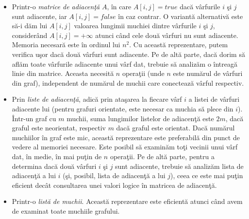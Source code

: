 \documentclass{article}
\begin{document}
\begin{itemize}
	\item Printr-o \textit{matrice de adiacenţă} $A$, în care $A[i, j] = true$ dacă vârfurile $i$ şi $j$ sunt adiacente, iar $A[i, j]=false$ în caz contrar. O variantă alternativă este să-i dăm lui $A[i, j]$ valoarea lungimii muchiei dintre vârfurile $i$ şi $j$, considerând $A[i, j]=+\infty$ atunci când cele două vârfuri nu sunt adiacente. Memoria necesară este în ordinul lui $n^2$. Cu această reprezentare, putem verifica uşor dacă două vârfuri sunt adiacente. Pe de altă parte, dacă dorim să aflăm toate vârfurile adiacente unui vârf dat, trebuie să analizăm o întreagă linie din matrice. Aceasta necesită $n$ operaţii (unde $n$ este numărul de vârfuri din graf), independent de numărul de muchii care conectează vârful respectiv.

	\item Prin \textit{liste de adiacenţă}, adică prin ataşarea la fiecare vârf $i$ a listei de vârfuri adiacente lui (pentru grafuri orientate, este necesar ca muchia să plece din $i$). Într-un graf cu $m$ muchii, suma lungimilor listelor de adiacenţă este $2m$, dacă graful este neorientat, respectiv $m$ dacă graful este orientat. Dacă numărul muchiilor în graf este mic, această reprezentare este preferabilă din punct de vedere al memoriei necesare. Este posibil să examinăm toţi vecinii unui vârf dat, în medie, în mai puţin de $n$ operaţii. Pe de altă parte, pentru a determina dacă două vârfuri $i$ şi $j$ sunt adiacente, trebuie să analizăm lista de adiacenţă a lui $i$ (şi, posibil, lista de adiacenţă a lui $j$), ceea ce este mai puţin eficient decât consultarea unei valori logice în matricea de adiacenţă.

	\item Printr-o \textit{listă de muchii}. Această reprezentare este eficientă atunci când avem de examinat toate muchiile grafului.
\end{itemize}
\end{document}
